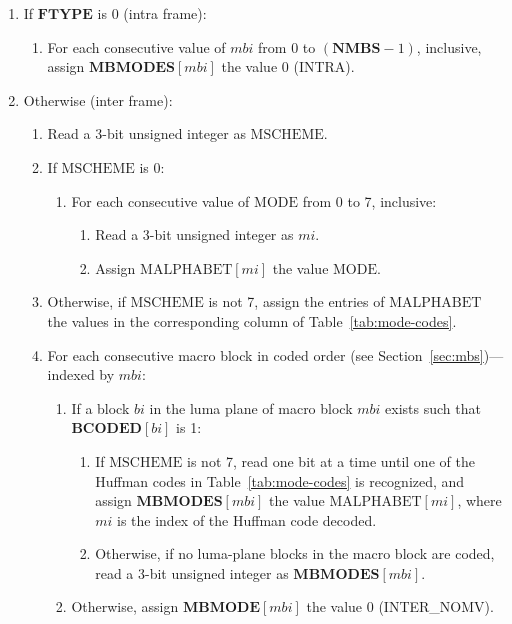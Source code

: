 \documentclass[11pt,letterpaper]{book}
\newcommand{\idx}[1]{{\ensuremath{\mathit{#1}}}}
\newcommand{\bi}{\idx{bi}}
\newcommand{\mbi}{\idx{mbi}}
\newcommand{\mi}{\idx{mi}}
\newcommand{\bitvar}[1]{\ensuremath{\mathbf{\bm #1}}}
\newcommand{\locvar}[1]{\ensuremath{\mathrm{#1}}}
\numberwithin{equation}{chapter}
\numberwithin{figure}{chapter}
\numberwithin{table}{chapter}
\begin{document}
\begin{enumerate}
\item
If \bitvar{FTYPE} is 0 (intra frame):
\begin{enumerate}
\item
For each consecutive value of \locvar{\mbi} from 0 to $(\bitvar{NMBS}-1)$,
 inclusive, assign $\bitvar{MBMODES}[\mbi]$ the value 0 (INTRA).
\end{enumerate}
\item
Otherwise (inter frame):
\begin{enumerate}
\item
Read a 3-bit unsigned integer as \locvar{MSCHEME}.
\item
If \locvar{MSCHEME} is 0:
\begin{enumerate}
\item
For each consecutive value of \locvar{MODE} from 0 to 7, inclusive:
\begin{enumerate}
\item
Read a 3-bit unsigned integer as \locvar{\mi}.
\item
Assign $\locvar{MALPHABET}[\mi]$ the value \locvar{MODE}.
\end{enumerate}
\end{enumerate}
\item
Otherwise, if \locvar{MSCHEME} is not 7, assign the entries of
 \locvar{MALPHABET} the values in the corresponding column of
 Table~\ref{tab:mode-codes}.
\item
For each consecutive macro block in coded order (see
 Section~\ref{sec:mbs})---indexed by \locvar{\mbi}:
\begin{enumerate}
\item
If a block \locvar{\bi} in the luma plane of macro block \locvar{\mbi} exists
 such that $\bitvar{BCODED}[\locvar{\bi}]$ is 1:
\begin{enumerate}
\item
If \locvar{MSCHEME} is not 7, read one bit at a time until one of the Huffman
 codes in Table~\ref{tab:mode-codes} is recognized, and assign
 $\bitvar{MBMODES}[\locvar{\mbi}]$ the value
 $\locvar{MALPHABET}[\locvar{\mi}]$, where \locvar{\mi} is the index of the
 Huffman code decoded.
\item
Otherwise, if no luma-plane blocks in the macro block are coded, read a 3-bit
 unsigned integer as $\bitvar{MBMODES}[\locvar{\mbi}]$.
\end{enumerate}
\item
Otherwise, assign $\bitvar{MBMODE}[\locvar{\mbi}]$ the value 0 (INTER\_NOMV).
\end{enumerate}
\end{enumerate}
\end{enumerate}
\end{document}
